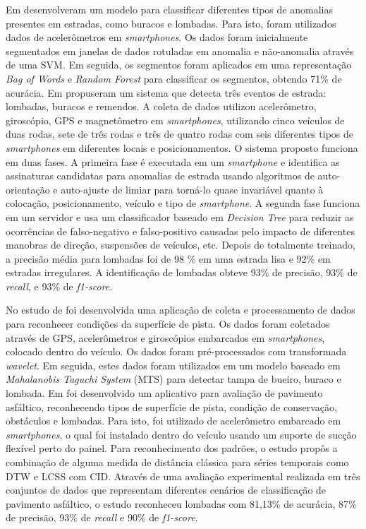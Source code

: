 Em \cite{Aragon2016} desenvolveram um modelo para classificar diferentes tipos de anomalias presentes em estradas, como buracos e lombadas. Para isto, foram utilizados dados de acelerômetros em \textit{smartphones}. Os dados foram inicialmente segmentados em janelas de dados rotuladas em anomalia e não-anomalia através de uma SVM. Em seguida, os segmentos foram aplicados em uma representação \textit{Bag of Words} e \textit{Random Forest} para classificar os segmentos, obtendo 71\% de acurácia. Em \cite{Alam2020} propuseram um sistema que detecta três eventos de estrada: lombadas, buracos e remendos. A coleta de dados utilizou acelerômetro, giroscópio, GPS e magnetômetro em \textit{smartphones}, utilizando cinco veículos de duas rodas, sete de três rodas e três de quatro rodas com seis diferentes tipos de \textit{smartphones} em diferentes locais e posicionamentos. O sistema proposto funciona em duas fases. A primeira fase é executada em um \textit{smartphone} e identifica as assinaturas candidatas para anomalias de estrada usando algoritmos de auto-orientação e auto-ajuste de limiar para torná-lo quase invariável quanto à colocação, posicionamento, veículo e tipo de \textit{smartphone}. A segunda fase funciona em um servidor e usa um classificador baseado em \textit{Decision Tree} para reduzir as ocorrências de falso-negativo e falso-positivo causadas pelo impacto de diferentes manobras de direção, suspensões de veículos, etc. Depois de totalmente treinado, a precisão média para lombadas foi de 98 \% em uma estrada lisa e 92\% em estradas irregulares. A identificação de lombadas obteve 93\% de precisão, 93\% de \textit{recall}, e 93\% de \textit{f1-score}.

No estudo de \cite{Wang2018} foi desenvolvida uma aplicação de coleta e processamento de dados para reconhecer condições da superfície de pista. Os dados foram coletados através de GPS, acelerômetros e giroscópios embarcados em \textit{smartphones}, colocado dentro do veículo. Os dados foram pré-processados com transformada \textit{wavelet}. Em seguida, estes dados foram utilizados em um modelo baseado em \textit{Mahalanobis Taguchi System} (MTS) para detectar tampa de bueiro, buraco e lombada. Em \cite{Souza2018} foi desenvolvido um aplicativo para avaliação de pavimento asfáltico, reconhecendo tipos de superfície de pista, condição de conservação, obstáculos e lombadas. Para isto, foi utilizado de acelerômetro embarcado em \textit{smartphones}, o qual foi instalado dentro do veículo usando um suporte de sucção flexível perto do painel. Para reconhecimento dos padrões, o estudo propôs a combinação de alguma medida de distância clássica para séries temporais como DTW e LCSS com CID. Através de uma avaliação experimental realizada em três conjuntos de dados que representam diferentes cenários de classificação de pavimento asfáltico, o estudo reconheceu lombadas com 81,13\% de acurácia, 87\% de precisão, 93\% de \textit{recall} e 90\% de \textit{f1-score}.

